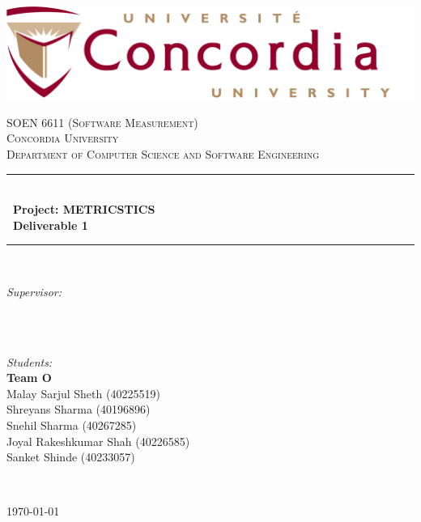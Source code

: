 \begin{titlepage}

\newcommand{\HRule}{\rule{\linewidth}{0.5mm}}


\includegraphics[width=14cm]{images/uni_logo.png}\\[2cm] 

\center 

\textsc{\LARGE SOEN 6611 (Software Measurement)}\\[0.5cm] 
\textsc{\large Concordia University}\\[0.1cm] 
\textsc{\large Department of Computer Science and Software Engineering}\\[1.5cm] 


\makeatletter
\HRule \\[0.4cm]
{ \huge \bfseries \ Project: METRICSTICS}\\[0.4cm]
{ \huge \bfseries \ Deliverable 1}\\[0.4cm]
\HRule \\[1.5cm]


\begin{minipage}{0.5\textwidth}
\begin{flushleft} \large
\emph{Supervisor:}\\
\@author\\
\end{flushleft}
\end{minipage}
~
\begin{minipage}{0.4\textwidth}
\emph{Students:} \\[1.2em]
\textbf{Team O}\cite{git-location}\\
Malay Sarjul Sheth (40225519)\\
Shreyans Sharma (40196896)\\
Snehil Sharma (40267285)\\ 
Joyal Rakeshkumar Shah (40226585)\\ 
Sanket Shinde (40233057)\\[1.2em]


\end{minipage}\\[3cm]
\makeatother

{\large \today}\\[0.5cm] 
\vfill

\end{titlepage}